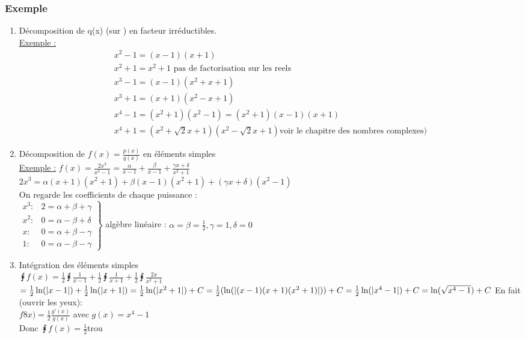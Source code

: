 \documentclass[12pt,a4paper]{article}
\begin{document}
{\subsubsection{Exemple}
\begin{enumerate}
	\item Décomposition de q(x) (sur \R) en facteur irréductibles.\\
	 \underline{Exemple :} \begin{align*}
	 x^2-1 = (x-1)(x+1)\\
	 x^2+1 = x^2+1 \text{ pas de factorisation sur les reels}\\
	 x^3-1 = (x-1)(x^2+x+1)\\
	 x^3+1 = (x+1)(x^2-x+1)\\
	 x^4-1 = (x^2+1)(x^2-1) = (x^2+1)(x-1)(x+1)\\
	 x^4+1 =  (x^2+\sqrt{2}x + 1)(x^2-\sqrt{2}x +1) \text{voir le chapitre des nombres complexes)}
	 \end{align*}
	 \item Décomposition de $f(x) = \frac{p(x)}{q(x)}$ en éléments simples\\
	 \underline{Exemple :} $f(x) = \frac{2x^3}{x^4-1} = \frac{\alpha}{x-1} + \frac{\beta}{x-1} + \frac{\gamma x + \delta}{x^2+1}$\\
	 $2x^3 = \alpha(x+1)(x^2+1) + \beta(x-1)(x^2+1) + (\gamma x + \delta)(x^2-1)$\\
	 On regarde les coefficients de chaque puissance : \\
	 $\left.
		 \begin{array}{ll}
			 x^3 : & 2 = \alpha + \beta + \gamma\\
			 x^2 : & 0 = \alpha - \beta + \delta\\
			 x : & 0 = \alpha + \beta - \gamma\\
			 1 : & 0 = \alpha - \beta - \gamma
		 \end{array}
		\right\}$ algèbre linéaire : $\alpha = \beta = \frac{1}{2}, \gamma = 1, \delta = 0$
	\item Intégration des éléments simples\\
	$\intx{}{}{f(x)} = \frac{1}{2}\intx{}{}{\frac{1}{x-1}} + \frac{1}{2}\intx{}{}{\frac{1}{x+1}} + \frac{1}{2}\intx{}{}{\frac{2x}{x^2+1}}$\\
	$= \frac{1}{2}\ln(|x-1|) + \frac{1}{2}\ln(|x+1|) = \frac{1}{2}\ln(|x^2+1|) + C\\
	= \frac{1}{2}(\ln(|(x-1)(x+1)(x^2+1)|)) + C\\
	= \frac{1}{2}\ln(|x^4-1|) + C = \ln(\sqrt{x^4 -1}) + C$
	En fait (ouvrir les yeux):\\
	$f8x) = \frac{1}{2} \frac{g'(x)}{g(x)}$ avec $g(x) = x^4-1$\\
	Donc $\intx{}{}{f(x)} = \frac{1}{2}${trou}
\end{enumerate}
}
\end{document}
